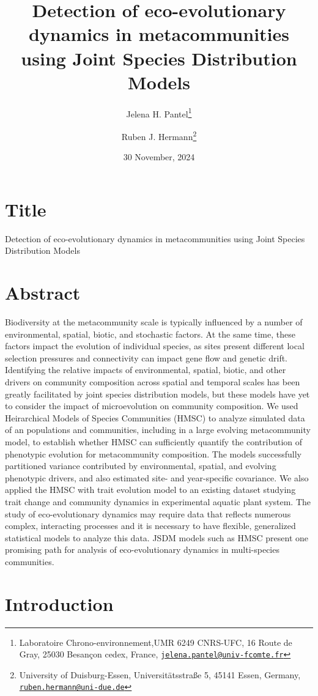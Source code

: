 \documentclass[
]{article}
\title{Detection of eco-evolutionary dynamics in metacommunities using Joint Species Distribution Models}
\author{Jelena H. Pantel\footnote{Laboratoire Chrono-environnement,UMR 6249 CNRS-UFC, 16 Route de Gray, 25030 Besançon cedex, France, \href{mailto:jelena.pantel@univ-fcomte.fr}{\nolinkurl{jelena.pantel@univ-fcomte.fr}}} \and Ruben J. Hermann\footnote{University of Duisburg-Essen, Universitätsstraße 5, 45141 Essen, Germany, \href{mailto:ruben.hermann@uni-due.de}{\nolinkurl{ruben.hermann@uni-due.de}}}}
\date{30 November, 2024}
\begin{document}
\maketitle

\newpage

\hypertarget{title}{%
\section{Title}\label{title}}

Detection of eco-evolutionary dynamics in metacommunities using Joint Species Distribution Models

\hypertarget{abstract}{%
\section{Abstract}\label{abstract}}

Biodiversity at the metacommunity scale is typically influenced by a number of environmental, spatial, biotic, and stochastic factors. At the same time, these factors impact the evolution of individual species, as sites present different local selection pressures and connectivity can impact gene flow and genetic drift. Identifying the relative impacts of environmental, spatial, biotic, and other drivers on community composition across spatial and temporal scales has been greatly facilitated by joint species distribution models, but these models have yet to consider the impact of microevolution on community composition. We used Heirarchical Models of Species Communities (HMSC) to analyze simulated data of an populations and communities, including in a large evolving metacommunity model, to establish whether HMSC can sufficiently quantify the contribution of phenotypic evolution for metacommunity composition. The models successfully partitioned variance contributed by environmental, spatial, and evolving phenotypic drivers, and also estimated site- and year-specific covariance. We also applied the HMSC with trait evolution model to an existing dataset studying trait change and community dynamics in experimental aquatic plant system. The study of eco-evolutionary dynamics may require data that reflects numerous complex, interacting processes and it is necessary to have flexible, generalized statistical models to analyze this data. JSDM models such as HMSC present one promising path for analysis of eco-evolutionary dynamics in multi-species communities.

\hypertarget{introduction}{%
\section{Introduction}\label{introduction}}
\end{document}
